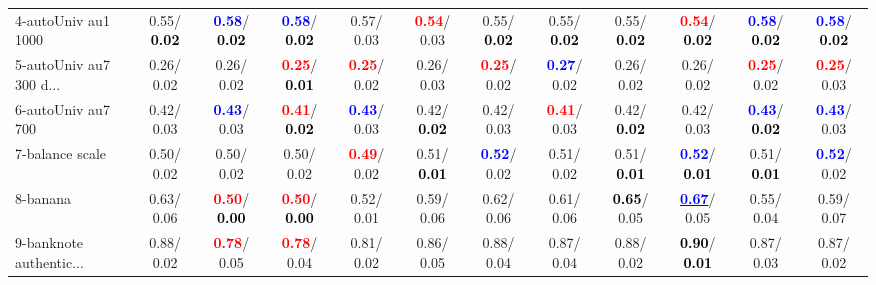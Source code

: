 \begin{table}[h]
\begin{center}
{\begin{tabular}{lc|c|c|c|c|c|c|c|c|c|c}
4-autoUniv au1 1000 &   0.55/\textcolor{black}{\textbf{  0.02}} & \textcolor{blue}{\textbf{  0.58}}/\textcolor{black}{\textbf{  0.02}} & \textcolor{blue}{\textbf{  0.58}}/\textcolor{black}{\textbf{  0.02}} &   0.57/  0.03 & \textcolor{red}{\textbf{  0.54}}/  0.03 &   0.55/\textcolor{black}{\textbf{  0.02}} &   0.55/\textcolor{black}{\textbf{  0.02}} &   0.55/\textcolor{black}{\textbf{  0.02}} & \textcolor{red}{\textbf{  0.54}}/\textcolor{black}{\textbf{  0.02}} & \textcolor{blue}{\textbf{  0.58}}/\textcolor{black}{\textbf{  0.02}} & \textcolor{blue}{\textbf{  0.58}}/\textcolor{black}{\textbf{  0.02}} \\
5-autoUniv au7 300 d... &   0.26/  0.02 &   0.26/  0.02 & \textcolor{red}{\textbf{  0.25}}/\textcolor{black}{\textbf{  0.01}} & \textcolor{red}{\textbf{  0.25}}/  0.02 &   0.26/  0.03 & \textcolor{red}{\textbf{  0.25}}/  0.02 & \textcolor{blue}{\textbf{  0.27}}/  0.02 &   0.26/  0.02 &   0.26/  0.02 & \textcolor{red}{\textbf{  0.25}}/  0.02 & \textcolor{red}{\textbf{  0.25}}/  0.03 \\
6-autoUniv au7 700 &   0.42/  0.03 & \textcolor{blue}{\textbf{  0.43}}/  0.03 & \textcolor{red}{\textbf{  0.41}}/\textcolor{black}{\textbf{  0.02}} & \textcolor{blue}{\textbf{  0.43}}/  0.03 &   0.42/\textcolor{black}{\textbf{  0.02}} &   0.42/  0.03 & \textcolor{red}{\textbf{  0.41}}/  0.03 &   0.42/\textcolor{black}{\textbf{  0.02}} &   0.42/  0.03 & \textcolor{blue}{\textbf{  0.43}}/\textcolor{black}{\textbf{  0.02}} & \textcolor{blue}{\textbf{  0.43}}/  0.03 \\
7-balance scale &   0.50/  0.02 &   0.50/  0.02 &   0.50/  0.02 & \textcolor{red}{\textbf{  0.49}}/  0.02 &   0.51/\textcolor{black}{\textbf{  0.01}} & \textcolor{blue}{\textbf{  0.52}}/  0.02 &   0.51/  0.02 &   0.51/\textcolor{black}{\textbf{  0.01}} & \textcolor{blue}{\textbf{  0.52}}/\textcolor{black}{\textbf{  0.01}} &   0.51/\textcolor{black}{\textbf{  0.01}} & \textcolor{blue}{\textbf{  0.52}}/  0.02 \\ \hline
8-banana &   0.63/  0.06 & \textcolor{red}{\textbf{  0.50}}/\textcolor{black}{\textbf{  0.00}} & \textcolor{red}{\textbf{  0.50}}/\textcolor{black}{\textbf{  0.00}} &   0.52/  0.01 &   0.59/  0.06 &   0.62/  0.06 &   0.61/  0.06 & \textcolor{black}{\textbf{  0.65}}/  0.05 & \underline{\textcolor{blue}{\textbf{  0.67}}}/  0.05 &   0.55/  0.04 &   0.59/  0.07 \\
9-banknote authentic... &   0.88/  0.02 & \textcolor{red}{\textbf{  0.78}}/  0.05 & \textcolor{red}{\textbf{  0.78}}/  0.04 &   0.81/  0.02 &   0.86/  0.05 &   0.88/  0.04 &   0.87/  0.04 &   0.88/  0.02 & \textcolor{black}{\textbf{  0.90}}/\textcolor{black}{\textbf{  0.01}} &   0.87/  0.03 &   0.87/  0.02 \\

\end{tabular}}
\end{center}
\end{table}
